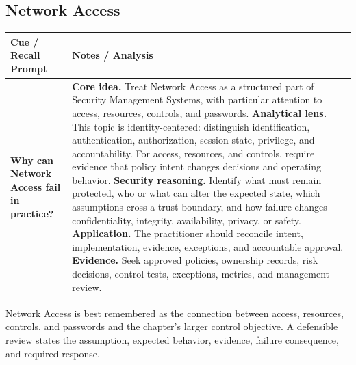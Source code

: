 \documentclass[11pt]{article}
\newcommand{\CornellHeader}{%
\rowcolor{Navy}\color{white}\bfseries Cue / Recall Prompt & \color{white}\bfseries Notes / Analysis\\\hline}
\newcommand{\CornellRow}[2]{%
\cellcolor{CueGray}\RaggedRight\textbf{#1} & \RaggedRight #2\\\hline}
\begin{document}
\subsection*{Network Access}
\begin{longtable}{>{\RaggedRight\arraybackslash}p{}|>{\RaggedRight\arraybackslash}p{}}
\CornellHeader
\CornellRow{Why can Network Access fail in practice?}{\textbf{Core idea.} Treat Network Access as a structured part of Security Management Systems, with particular attention to access, resources, controls, and passwords. \textbf{Analytical lens.} This topic is identity-centered: distinguish identification, authentication, authorization, session state, privilege, and accountability. For access, resources, and controls, require evidence that policy intent changes decisions and operating behavior. \textbf{Security reasoning.} Identify what must remain protected, who or what can alter the expected state, which assumptions cross a trust boundary, and how failure changes confidentiality, integrity, availability, privacy, or safety. \textbf{Application.} The practitioner should reconcile intent, implementation, evidence, exceptions, and accountable approval. \textbf{Evidence.} Seek approved policies, ownership records, risk decisions, control tests, exceptions, metrics, and management review.}
\end{longtable}
\begin{topicsummary}
Network Access is best remembered as the connection between access, resources, controls, and passwords and the chapter's larger control objective. A defensible review states the assumption, expected behavior, evidence, failure consequence, and required response.
\end{topicsummary}
\end{document}
